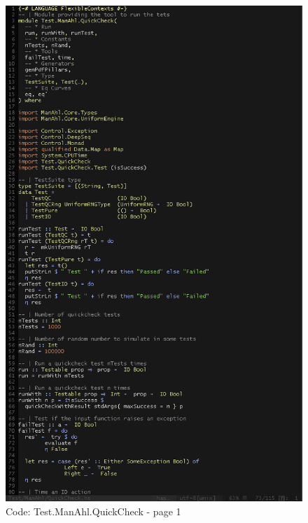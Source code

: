 \documentclass[12pt,a4paper,article]{memoir} %
\begin{document}
\begin{figure}[h!]
\centering
\includegraphics[width=1\textwidth]{img/code-test-quickcheck-1.png}
\caption{Code: Test.ManAhl.QuickCheck - page 1}
\label{fig:test.qc1}
\end{figure}
\end{document}
